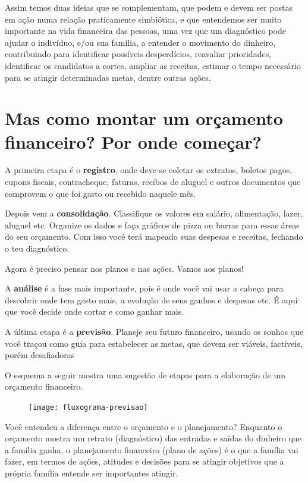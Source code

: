 Assim temos duas ideias que se complementam, que podem e devem ser postas em ação numa relação praticamente simbiótica, e que entendemos ser muito importante na vida financeira das pessoas, uma vez que um diagnóstico pode ajudar o indivíduo, e/ou sua família, a entender o movimento do dinheiro, contribuindo para identificar possíveis desperdícios, reavaliar prioridades, identificar os candidatos a cortes, ampliar as receitas, estimar o tempo necessário para se atingir determinadas metas, dentre outras ações.

\section{Mas como montar um orçamento financeiro? Por onde começar?}

A primeira etapa é o \textbf{registro}, onde deve-se coletar os extratos, boletos pagos, cupons fiscais, contracheque, faturas, recibos de aluguel e outros documentos que comprovem o que foi gasto ou recebido naquele mês.

Depois vem a \textbf{consolidação}. Classifique os valores em salário, alimentação, lazer, aluguel etc. Organize os dados e faça gráficos de pizza ou barras para essas áreas do seu orçamento. Com isso você terá mapeado suas despesas e receitas, fechando o teu diagnóstico.

Agora é preciso pensar nos planos e nas ações. Vamos aos planos!

A \textbf{análise} é a fase mais importante, pois é onde você vai usar a cabeça para descobrir onde tem gasto mais, a evolução de seus ganhos e despesas etc. É aqui que você decide onde cortar e como ganhar mais.   

A última etapa é a \textbf{previsão}. Planeje seu futuro financeiro, usando os sonhos que você traçou como guia para estabelecer as metas, que devem ser viáveis, factíveis, porém desafiadoras

O esquema a seguir mostra uma sugestão de etapas para a elaboração de um orçamento financeiro. 

\begin{figure}[H]
\centering
\texttt{[image: fluxograma-previsao]}

\caption{\cite{zentgraf2015}}
\end{figure}

Você entendeu a diferença entre o orçamento e o planejamento? Enquanto o orçamento mostra um retrato (diagnóstico) das entradas e saídas do dinheiro que a família ganha, o planejamento financeiro (plano de ações) é o que a família vai fazer, em termos de ações, atitudes e decisões para se atingir objetivos que a própria família entende ser importantes atingir. 

